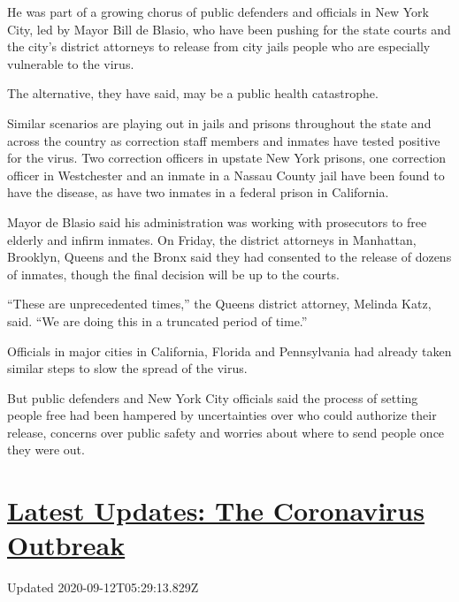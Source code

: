 He was part of a growing chorus of public defenders and officials in New
York City, led by Mayor Bill de Blasio, who have been pushing for the
state courts and the city's district attorneys to release from city
jails people who are especially vulnerable to the virus.

The alternative, they have said, may be a public health catastrophe.

Similar scenarios are playing out in jails and prisons throughout the
state and across the country as correction staff members and inmates
have tested positive for the virus. Two correction officers in upstate
New York prisons, one correction officer in Westchester and an inmate in
a Nassau County jail have been found to have the disease, as have two
inmates in a federal prison in California.

Mayor de Blasio said his administration was working with prosecutors to
free elderly and infirm inmates. On Friday, the district attorneys in
Manhattan, Brooklyn, Queens and the Bronx said they had consented to the
release of dozens of inmates, though the final decision will be up to
the courts.

``These are unprecedented times,'' the Queens district attorney, Melinda
Katz, said. ``We are doing this in a truncated period of time.''

Officials in major cities in California, Florida and Pennsylvania had
already taken similar steps to slow the spread of the virus.

But public defenders and New York City officials said the process of
setting people free had been hampered by uncertainties over who could
authorize their release, concerns over public safety and worries about
where to send people once they were out.

\hypertarget{latest-updates-the-coronavirus-outbreak}{%
\section{\texorpdfstring{\href{https://www.nytimes3xbfgragh.onion/2020/09/11/world/covid-19-coronavirus.html?action=click\&pgtype=Article\&state=default\&region=MAIN_CONTENT_1\&context=storylines_live_updates}{Latest
Updates: The Coronavirus
Outbreak}}{Latest Updates: The Coronavirus Outbreak}}\label{latest-updates-the-coronavirus-outbreak}}

Updated 2020-09-12T05:29:13.829Z

